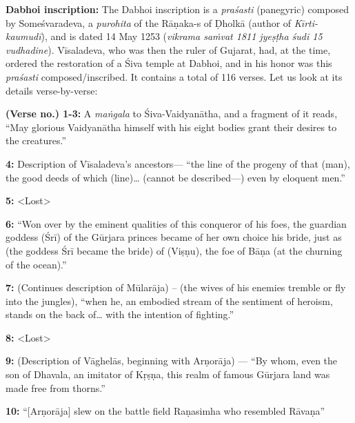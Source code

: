 \smallskip
\noindent
{\bf Dabhoi inscription:} The Dabhoi inscription is a {\sl praśasti} (panegyric) composed by Someśvaradeva, a {\sl purohita} of the Rāṇaka-s of Ḍholkā (author of {\sl Kīrti-kaumudī}), and is dated 14 May 1253 ({\sl vikrama saṁvat 1811 jyeṣṭha śudi 15 vudhadine}). Vīsaladeva, who was then the ruler of Gujarat, had, at the time, ordered the restoration of a Śiva temple at Dabhoi, and in his honor was this {\sl praśasti} composed/inscribed. It contains a total of 116 verses. Let us look at its details verse-by-verse:

\smallskip
\noindent
{\bf (Verse no.) 1-3:} A {\sl maṅgala} to Śiva-Vaidyanātha, and a fragment of it reads, “May glorious Vaidyanātha himself with his eight bodies grant their desires to the creatures.”

\smallskip
\noindent
{\bf 4:} Description of Vīsaladeva’s ancestors— “the line of the progeny of that (man), the good deeds of which (line)… (cannot be described—) even by eloquent men.”

\smallskip
\noindent
{\bf 5:} <Lost>

\smallskip
\noindent
{\bf 6:} “Won over by the eminent qualities of this conqueror of his foes, the guardian goddess (Śrī) of the Gūrjara princes became of her own choice his bride, just as (the goddess Śrī became the bride) of (Viṣṇu), the foe of Bāṇa (at the churning of the ocean).” 

\smallskip
\noindent
{\bf 7:} (Continues description of Mūlarāja) – (the wives of his enemies tremble or fly into the jungles), “when he, an embodied stream of the sentiment of heroism, stands on the back of… with the intention of fighting.”

\smallskip
\noindent
{\bf 8:} <Lost>

\smallskip
\noindent
{\bf 9:} (Description of Vāghelās, beginning with Arṇorāja) — “By whom, even the son of Dhavala, an imitator of Kṛṣṇa, this realm of famous Gūrjara land was made free from thorns.”

\smallskip
\noindent
{\bf 10:} “[Arṇorāja] slew on the battle field Raṇasimha who resembled Rāvaṇa”

